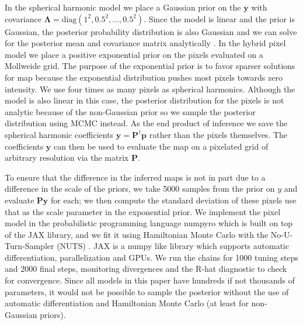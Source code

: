 \documentclass[modern]{aastex62}
\begin{document}
In the spherical harmonic model we place a Gaussian prior on the $\mathbf{y}$ with covariance $\boldsymbol{\Lambda}=\mathrm{diag}(1^2,0.5^2,\dots,0.5^2)$.
Since the model is linear and the prior is Gaussian, the posterior probability distribution is also Gaussian and we can solve for the posterior mean and covariance matrix analytically \citep{luger2019a}.
In the hybrid pixel model we place a positive exponential prior on the pixels evaluated on a Mollweide grid. 
The purpose of the exponential prior is to favor sparser solutions for map because the exponential distribution pushes most pixels towards zero intensity.
We use four times as many pixels as spherical harmonics.
Although the model is also linear in this case, the posterior distribution for the pixels is not analytic because of the non-Gaussian prior so we sample the posterior distribution using MCMC instead.
As the end product of inference we save the spherical harmonic coefficients $\mathbf{y}=\mathbf{P}^\dagger\mathbf{p}$ rather than the pixels themselves.
The coefficients $\mathbf{y}$ can then be used to evaluate the map on a pixelated grid of arbitrary resolution via the matrix $\mathbf{P}$. 

To ensure that the difference in the inferred maps is not in part due to a difference in the scale of the priors, we take 5000 samples from the prior on $y$ and evaluate $\mathbf{P}\mathbf{y}$ for each; we then compute the standard deviation of these pixels use that as the scale parameter in the exponential prior.
We implement the pixel model in the probabilistic programming language \textsf{numpyro} \citep{phan2019a} which is built on top of the \textsf{JAX} \citep{jax2018github} library, and we fit it using Hamiltonian Monte Carlo with the No-U-Turn-Sampler (NUTS) \citep{hoffman2014}.
\textsf{JAX} is a \textsf{numpy} like library which supports automatic differentiation, parallelization and GPUs.
We run the chains for 1000 tuning steps and 2000 final steps, monitoring divergences \citep{betancourt2013} and the R-hat  diagnostic  \citep{gelman1992a} to check for convergence.
Since all models in this paper have hundreds if not thousands of parameters, it would not be possible to sample the posterior  without the use of automatic differentiation and Hamiltonian Monte Carlo (at least for non-Gaussian priors).
\end{document}
